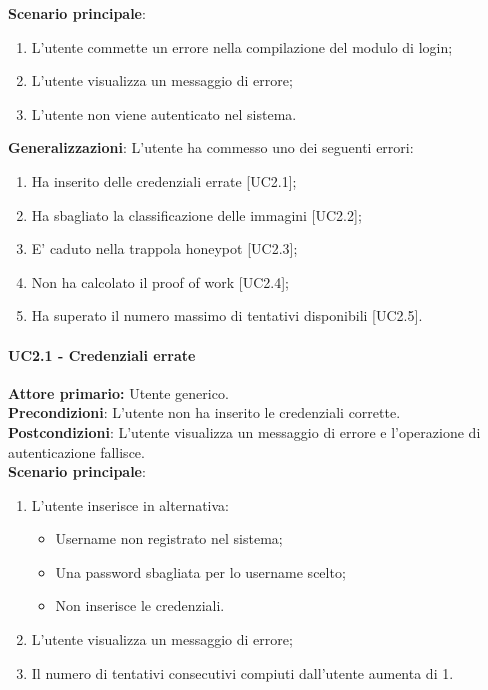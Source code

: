 \textbf{Scenario principale}:
\begin{enumerate}
   \item L’utente commette un errore nella compilazione del modulo di login;
   \item L'utente visualizza un messaggio di errore;
   \item L'utente non viene autenticato nel sistema.
\end{enumerate}

\textbf{Generalizzazioni}: L'utente ha commesso uno dei seguenti errori:
\begin{enumerate}
	\item Ha inserito delle credenziali errate [UC2.1];
	\item Ha sbagliato la classificazione delle immagini [UC2.2];
	\item E' caduto nella trappola honeypot [UC2.3];
	\item Non ha calcolato il proof of work [UC2.4];
	\item Ha superato il numero massimo di tentativi disponibili [UC2.5].
\end{enumerate}

\paragraph{UC2.1 - Credenziali errate}
\textbf{Attore primario:} Utente generico.\\
\textbf{Precondizioni}: L’utente non ha inserito le credenziali corrette.\\
\textbf{Postcondizioni}: L’utente visualizza un messaggio di errore e l’operazione di autenticazione fallisce.\\

\textbf{Scenario principale}:
\begin{enumerate}
    \item L'utente inserisce in alternativa:
        \begin{itemize}
            \item Username non registrato nel sistema;
            \item Una password sbagliata per lo username scelto;
            \item Non inserisce le credenziali.
        \end{itemize}
	\item L’utente visualizza un messaggio di errore;
	\item Il numero di tentativi consecutivi compiuti dall’utente aumenta di 1.
\end{enumerate}

